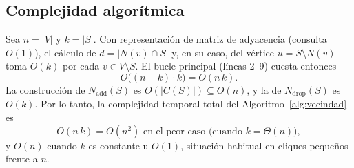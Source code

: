 \documentclass[letterpaper,12pt]{article}
\begin{document}

\subsection{Complejidad algorítmica}

Sea $n=|V|$ y $k=|S|$. Con representación de matriz de adyacencia (consulta $O(1)$), el cálculo de $d=|N(v)\cap S|$ y, en su caso, del vértice $u = S \setminus N(v)$ toma $O(k)$ por cada $v \in V\setminus S$. El bucle principal (líneas 2--9) cuesta entonces
\[
O\big((n-k)\cdot k\big) = O(n\,k).
\]
La construcción de $N_{\text{add}}(S)$ es $O(|C(S)|)\subseteq O(n)$, y la de $N_{\text{drop}}(S)$ es $O(k)$. Por lo tanto, la complejidad temporal total del Algoritmo~\ref{alg:vecindad} es
\[
O(n\,k) = O(n^2) \text{ en el peor caso (cuando } k = \Theta(n)),
\]
y $O(n)$ cuando $k$ es constante u $O(1)$, situación habitual en cliques pequeños frente a $n$.
\end{document}
